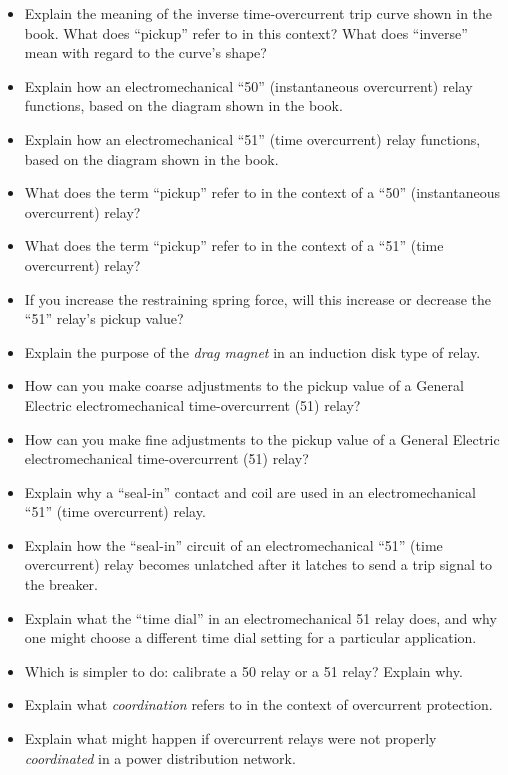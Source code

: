 \begin{itemize}
\item{} Explain the meaning of the inverse time-overcurrent trip curve shown in the book.  What does ``pickup'' refer to in this context?  What does ``inverse'' mean with regard to the curve's shape?
\item{} Explain how an electromechanical ``50'' (instantaneous overcurrent) relay functions, based on the diagram shown in the book.
\item{} Explain how an electromechanical ``51'' (time overcurrent) relay functions, based on the diagram shown in the book.
\item{} What does the term ``pickup'' refer to in the context of a ``50'' (instantaneous overcurrent) relay?
\item{} What does the term ``pickup'' refer to in the context of a ``51'' (time overcurrent) relay?
\item{} If you increase the restraining spring force, will this increase or decrease the ``51'' relay's pickup value?
\item{} Explain the purpose of the {\it drag magnet} in an induction disk type of relay.
\item{} How can you make coarse adjustments to the pickup value of a General Electric electromechanical time-overcurrent (51) relay?
\item{} How can you make fine adjustments to the pickup value of a General Electric electromechanical time-overcurrent (51) relay?
\item{} Explain why a ``seal-in'' contact and coil are used in an electromechanical ``51'' (time overcurrent) relay.
\item{} Explain how the ``seal-in'' circuit of an electromechanical ``51'' (time overcurrent) relay becomes unlatched after it latches to send a trip signal to the breaker.
\item{} Explain what the ``time dial'' in an electromechanical 51 relay does, and why one might choose a different time dial setting for a particular application.
\item{} Which is simpler to do: calibrate a 50 relay or a 51 relay?  Explain why.
\item{} Explain what {\it coordination} refers to in the context of overcurrent protection.
\item{} Explain what might happen if overcurrent relays were not properly {\it coordinated} in a power distribution network.
\end{itemize}














